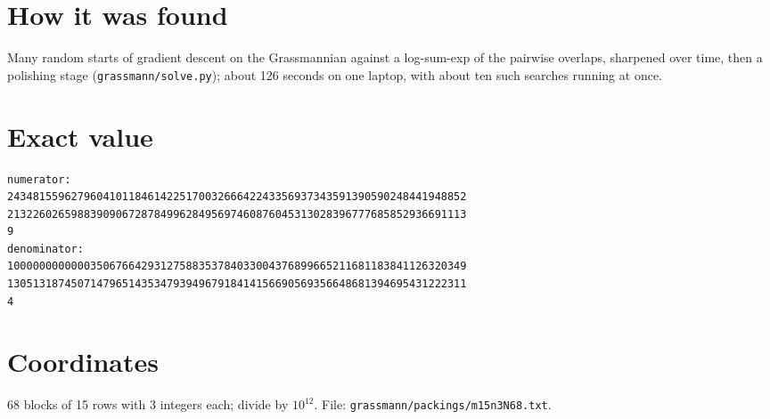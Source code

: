 \documentclass[11pt,a4paper]{article}
\begin{document}
\section{How it was found}
Many random starts of gradient descent on the Grassmannian against a log-sum-exp of the pairwise overlaps, sharpened over time, then a polishing stage (\texttt{grassmann/solve.py}); about 126 seconds on one laptop, with about ten such searches running at once.


\appendix
\section{Exact value}
{\small
\begin{verbatim}
numerator:
243481559627960410118461422517003266642243356937343591390590248441948852
213226026598839090672878499628495697460876045313028396777685852936691113
9
denominator:
100000000000035067664293127588353784033004376899665211681183841126320349
130513187450714796514353479394967918414156690569356648681394695431222311
4
\end{verbatim}}

\section{Coordinates}
68 blocks of 15 rows with 3 integers each; divide by $10^{12}$. File: \texttt{grassmann/packings/m15n3N68.txt}.
{\tiny
\begin{multicols}{3}
\end{multicols}}
\end{document}
